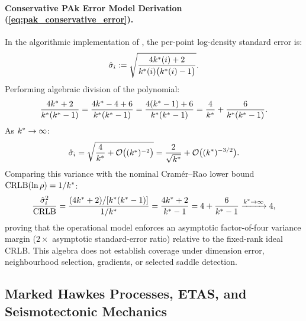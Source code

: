 \paragraph{Conservative PAk Error Model Derivation
(\cref{eq:pak_conservative_error}).}
In the algorithmic implementation of \pak{}, the per-point
log-density standard error is:
\begin{equation}
  \hat{\sigma}_i \mathrel{\mathop:}= \sqrt{\frac{4k^{*}(i) +
  2}{k^{*}(i)\bigl(k^{*}(i) - 1\bigr)}}.
\end{equation}
Performing algebraic division of the polynomial:
\begin{equation}
  \frac{4k^{*} + 2}{k^{*}(k^{*} - 1)} = \frac{4k^{*} - 4 +
  6}{k^{*}(k^{*} - 1)} = \frac{4(k^{*} - 1) + 6}{k^{*}(k^{*} -
  1)} = \frac{4}{k^{*}} + \frac{6}{k^{*}(k^{*} - 1)}.
\end{equation}
As $k^{*} \to \infty$:
\begin{equation}
  \hat{\sigma}_i = \sqrt{\frac{4}{k^{*}} +
  \mathcal{O}\bigl((k^{*})^{-2}\bigr)} = \frac{2}{\sqrt{k^{*}}} +
  \mathcal{O}\bigl((k^{*})^{-3/2}\bigr).
\end{equation}
Comparing this variance with the nominal Cram\'er--Rao lower bound
$\mathrm{CRLB}(\ln\rho) = 1/k^{*}$:
\begin{equation}
  \frac{\hat{\sigma}_i^2}{\mathrm{CRLB}} = \frac{(4k^{*} +
  2)/[k^{*}(k^{*} - 1)]}{1/k^{*}} = \frac{4k^{*} + 2}{k^{*} -
  1} = 4 + \frac{6}{k^{*} - 1} \xrightarrow{k^{*} \to \infty} 4,
\end{equation}
proving that the operational model enforces an asymptotic
factor-of-four variance margin
($2\times$ asymptotic standard-error ratio) relative to the fixed-rank
ideal CRLB. This algebra does not establish coverage under dimension
error, neighbourhood selection, gradients, or selected saddle detection.

\subsection{Marked Hawkes Processes, ETAS, and Seismotectonic Mechanics}
\label{subsec:supp_etas_mechanics}

